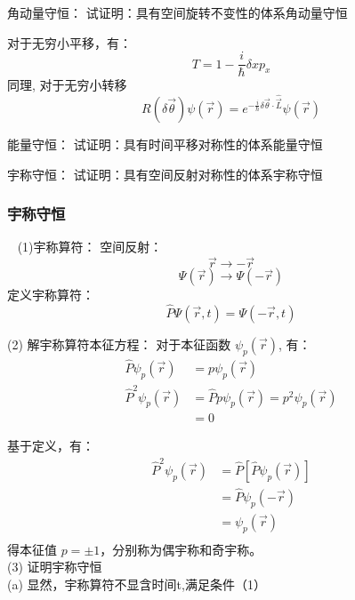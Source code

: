 \begin{frame} 
    \frametitle{} 
    \begin{tcolorbox2}{角动量守恒：}
        试证明：具有空间旋转不变性的体系角动量守恒                               
    \end{tcolorbox2}
    对于无穷小平移，有：
    $$T=1-\frac{i}{\hbar}\delta x p_x$$
    同理, 对于无穷小转移
    $$R(\delta \vec{\theta}) \psi(\vec{r})=e^{-\frac{i}{\hbar} \delta \vec{\theta} \cdot \widehat{\vec{L}}} \psi(\vec{r})
$$
    \begin{tcolorbox2}{能量守恒：}
        试证明：具有时间平移对称性的体系能量守恒                               
    \end{tcolorbox2}
    \begin{tcolorbox2}{宇称守恒：}
        试证明：具有空间反射对称性的体系宇称守恒                             
    \end{tcolorbox2}
\end{frame}

\begin{frame}
    \frametitle{宇称守恒} 
    \证~ (1)宇称算符：
    空间反射：$$\vec{r} \to -\vec{r} $$
    $$\Psi(\vec{r}) \to \Psi(-\vec{r}) $$
    定义宇称算符： $$ \hat{P}\Psi(\vec{r},t) = \Psi(-\vec{r},t) $$
    
    (2) 解宇称算符本征方程： 
    对于本征函数 $\psi_p (\vec{r})$, 有：
    $$\begin{aligned}
        \hat{P}\psi_p (\vec{r}) &= p\psi_p (\vec{r}) \\
        \hat{P}^2\psi_p (\vec{r}) &= \hat{P} p\psi_p (\vec{r}) = p^2\psi_p (\vec{r})\\
        &= 0
    \end{aligned}$$
\end{frame}

\begin{frame} 
    基于定义，有：
    $$\begin{aligned}
        \hat{P}^2\psi_p (\vec{r}) &= \hat{P} [\hat{P} \psi_p (\vec{r})]\\
        &= \hat{P} \psi_p (-\vec{r})\\
        &= \psi_p (\vec{r})\\
    \end{aligned}$$
    得本征值 $p=\pm 1$，分别称为偶宇称和奇宇称。\\ \vspace{0.6em}
    (3) 证明宇称守恒 \\
    (a) 显然，宇称算符不显含时间t,满足条件（1）\\

\end{frame}

